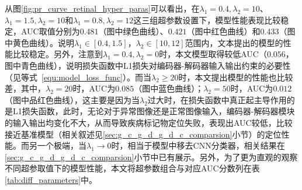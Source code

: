 从图\ref{fig:pr_curve_retinal_hyper_paras}可以看出，在$\lambda_{1}=0.4, \lambda_{2}=10$、$\lambda_{1}=1.5,\lambda_{2}=10$和$\lambda_{1}=0.8,\lambda_{2}=12$这三组超参数设置下，模型性能表现比较稳定，AUC取值分别为$0.481$（图中绿色曲线）、$0.421$（图中红色曲线）和$0.433$（图中黄色曲线）。说明$\lambda_{1}\in [0.4,1.5]$，$\lambda_{2}\in [10,12]$范围内，文本提出的模型的性能比较稳定。另外，注意到$\lambda_{1}=0.4,\lambda_{2}=0$时，本文模型取得较低AUC（$0.056$，图中青色曲线），说明损失函数中L1损失对编码器-解码器输入输出约束的必要性（见等式~\ref{equ:model_loss_func}）。而当$\lambda_{2}\geq 20$时，本文提出模型的性能也比较差，其中，$\lambda_{2}=20$时，AUC为$0.085$（图中蓝色曲线）；$\lambda_{2}=50$时，AUC为$0.012$（图中品红色曲线），这主要是因为当$\lambda_{2}$过大时，在损失函数中真正起主导作用的是L1损失函数，此时，无论对于异常图像还是正常图像输入，编码器-解码器模块的输入输出均变化不大，从而导致疾病标记物定位失败，表现出AUC较低，比较接近基准模型（相关叙述见\ref{sec:g_c_g_d_g_d_c_comparsion}小节）的定位性能。而另一个极端，当$\lambda_{1}\rightarrow 0$时，相当于模型中移去CNN分类器，相关结果在\ref{sec:g_c_g_d_g_d_c_comparsion}小节中已有展示。另外，为了更为直观的观察不同超参取值下的模型性能，本文将超参数组合与对应AUC分数列在表\ref{tab:diff_parameters}中。

\begin{table}[h]
	\centering
	\caption{不同超参数组合下，本文提出的模型在二类视网膜糖尿病病变数据集上计算得到的AUC分数列表。}		
	\label{tab:diff_parameters}
\end{table}

